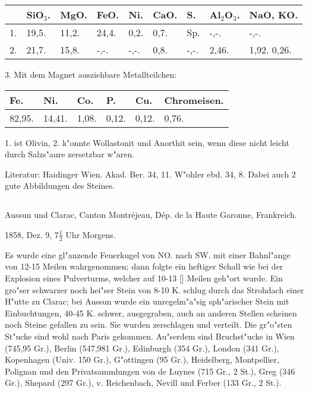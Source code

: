 \documentclass[a4paper, 11pt, oneside]{article}
\begin{document}
\begin{table}[H]
    \centering\swabfamily\Large
    \begin{tabular}{l l l l l l l l l}
         & SiO$_{3}$. & MgO. & FeO. & Ni. & CaO. & S. & Al$_{2}$O$_{3}$. & NaO, KO. \\ \hline
        1. & 19,5. & 11,2. & 24,4. & 0,2. & 0,7. & Sp. & -,-. & -,-. \\
        2. & 21,7. & 15,8. & -,-. & -,-. & 0,8. & -,-. & 2,46. & 1,92. 0,26. \\
    \end{tabular}
\end{table}

\begin{center}
3. Mit dem Magnet ausziehbare Metallteilchen:
\end{center}

\begin{table}[H]
    \centering\swabfamily\Large
    \begin{tabular}{l l l l l l}
        Fe. & Ni. & Co. & P. & Cu. & Chromeisen. \\ \hline
        82,95. & 14,41. & 1,08. & 0,12. & 0,12. & 0,76. \\
    \end{tabular}
\end{table}

1. ist Olivin, 2. k"onnte Wollastonit und Anorthit sein, wenn diese nicht leicht durch Salzs"aure zersetzbar w"aren.

\normalsize
Literatur: Haidinger Wien. Akad. Ber. 34, 11. W"ohler ebd. 34, 8. Dabei auch 2 gute Abbildungen des Steines.

\subsection{}
\LARGE
\paragraph{}
Aussun und Clarac, Canton Montréjeau, Dép. de la Haute Garonne, Frankreich.

1858, Dez. 9, $\mathfrak{7\frac{1}{2}}$ Uhr Morgens.

Es wurde eine gl"anzende Feuerkugel von NO. nach SW. mit einer Bahnl"ange von 12-15 Meilen wahrgenommen; dann folgte ein heftiger Schall wie bei der Explosion eines Pulverturms, welcher auf 10-13 [] Meilen geh"ort wurde. Ein gro"ser schwarzer noch hei"ser Stein von 8-10 K. schlug durch das Strohdach einer H"utte zu Clarac; bei Aussun wurde ein unregelm"a"sig sph"arischer Stein mit Einbuchtungen, 40-45 K. schwer, ausgegraben, auch an anderen Stellen scheinen noch Steine gefallen zu sein. Sie wurden zerschlagen und verteilt. Die gr"o"sten St"ucke sind wohl nach Paris gekommen. Au"serdem sind Bruchst"ucke in Wien (745,95 Gr.), Berlin (547,981 Gr.), Edinburgh (354 Gr.), London (341 Gr.), Kopenhagen (Univ. 150 Gr.), G"ottingen (95 Gr.), Heidelberg, Montpellier, Polignan und den Privatsammlungen von de Luynes (715 Gr., 2 St.), Greg (346 Gr.), Shepard (297 Gr.), v. Reichenbach, Nevill und Ferber (133 Gr., 2 St.).
\end{document}
